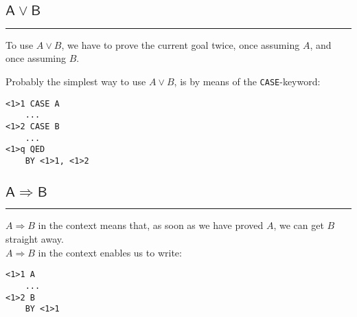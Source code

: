 \documentclass{article}
\newcommand{\code}[1]{\mathsf{#1}}
\begin{document}
\subsection{$\code{A \vee B}$}
\hrule
\vspace{10pt}
\begin{minipage}{230pt}
To use $A \vee B$, we have to prove the current goal twice, 
once assuming $A$, and once assuming $B$. \\

\vspace{5pt}

Probably the simplest way to use $A \vee B$, is by means of the
\verb|CASE|-keyword:

\vspace{15pt}
\end{minipage}
%
\hspace{15pt} \vline \hspace{15pt}
%
\begin{minipage}{80pt}
\begin{verbatim}
<1>1 CASE A
    ...
<1>2 CASE B
    ...
<1>q QED
    BY <1>1, <1>2
\end{verbatim}
\end{minipage}


\subsection{$\code{A \Rightarrow B}$}
\hrule
\vspace{10pt}
\begin{minipage}{230pt}
$A \Rightarrow B$ in the context means that, as soon as we have proved
$A$, we can get $B$ straight away.  \\

\vspace{5pt}
$A \Rightarrow B$ in the context enables us to write:

\vspace{15pt}
\end{minipage}
%
\hspace{15pt} \vline \hspace{15pt}
%
\begin{minipage}{80pt}
\begin{verbatim}
<1>1 A
    ...
<1>2 B
    BY <1>1
\end{verbatim}
\end{minipage}
\end{document}
